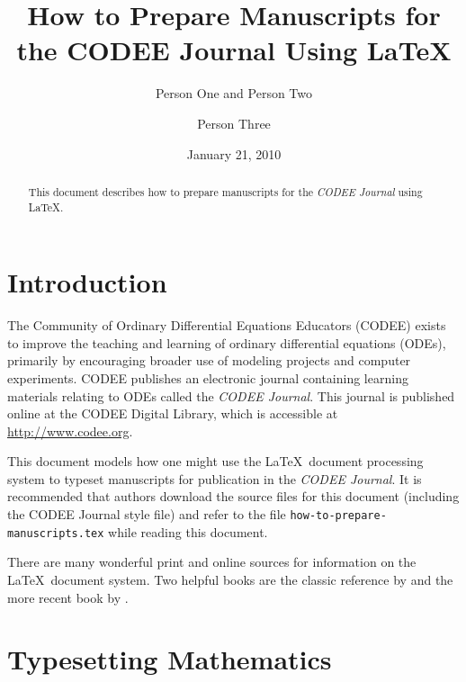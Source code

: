 \documentclass{codee}
\title{How to Prepare Manuscripts for the CODEE Journal Using \LaTeX}
\author{Person One and Person Two}
\affiliation{Institution A}
\author{Person Three}
\affiliation{Institution B}
\date{January 21, 2010}
\theoremstyle{definition}
\theoremstyle{remark}
\numberwithin{equation}{section}
\begin{document}
\maketitle

\begin{abstract}
  This document describes how to prepare manuscripts for the
  \textit{CODEE Journal} using \LaTeX.
\end{abstract}


\section{Introduction}

The Community of Ordinary Differential Equations Educators (CODEE)
exists to improve the teaching and learning of ordinary differential
equations (ODEs), primarily by encouraging broader use of modeling projects
and computer experiments. CODEE publishes an electronic journal
containing learning materials relating to ODEs called the
\textit{CODEE Journal}. This journal is published online at the CODEE
Digital Library, which is accessible at \url{http://www.codee.org}.


This document models how one might use the \LaTeX\ document processing
system to typeset manuscripts for publication in the \textit{CODEE
  Journal}. It is recommended that authors download the source files
for this document (including the CODEE Journal style file) and refer
to the file \texttt{how-to-prepare-manuscripts.tex} while reading this
document.

There are many wonderful print and online sources for information on the \LaTeX\ document system. Two helpful books are the classic reference by \citet{lamport-1994} and the more recent book by \citet{gratzer-2004}.

\section{Typesetting Mathematics}
\end{document}
